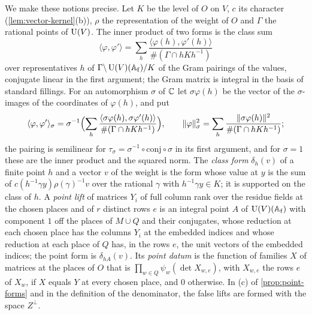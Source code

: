 We make these notions precise. Let $K$ be the level of $O$ on $V$, $c$ its character (\cref{lem:vector-kernel}(b)), $\rho$ the representation of the weight of $O$ and $\Gamma$ the rational points of $\operatorname{U}(V)$.
The inner product of two forms is the class sum
\[
  \langle\varphi,\varphi'\rangle=\sum_h\frac{\langle\varphi(h),\varphi'(h)\rangle}{\#(\Gamma\cap hKh^{-1})}
\]
over representatives $h$ of $\Gamma\backslash\operatorname{U}(V)(\mathbb{A}_{\rm f})/K$ of the Gram pairings of the values, conjugate linear in the first argument; the Gram matrix is integral in the basis of standard fillings. For an
automorphism $\sigma$ of $\mathbb{C}$ let $\sigma\varphi(h)$ be the vector of the $\sigma$-images of the coordinates of $\varphi(h)$, and put
\[
  \langle\varphi,\varphi'\rangle_\sigma=\sigma^{-1}\Bigl(\sum_h\frac{\langle\sigma\varphi(h),\sigma\varphi'(h)\rangle}{\#(\Gamma\cap hKh^{-1})}\Bigr),\qquad
  \lVert \varphi\rVert_\sigma^2=\sum_h\frac{\lVert \sigma\varphi(h)\rVert^2}{\#(\Gamma\cap hKh^{-1})};
\]
the pairing is semilinear for $\tau_\sigma=\sigma^{-1}\circ\mathrm{conj}\circ\sigma$ in its first argument, and for $\sigma=1$ these are the inner product and the squared norm. The \emph{class form} $\delta_h(v)$ of a
finite point $h$ and a vector $v$ of the weight is the form whose value at $y$ is the sum of $c(h^{-1}\gamma y)\rho(\gamma)^{-1}v$ over the rational $\gamma$ with $h^{-1}\gamma y\in K$; it is supported on the
class of $h$. A \emph{point lift} of matrices $Y_i$ of full column rank over the residue fields at the chosen places and of $r$ distinct rows $e$ is an integral point $A$ of $\operatorname{U}(V)(\mathbb{A}_{\rm f})$ with
component $1$ off the places of $M\cup Q$ and their conjugates, whose reduction at each chosen place has the columns $Y_i$ at the embedded indices and whose reduction at each place of $Q$ has, in
the rows $e$, the unit vectors of the embedded indices; the point form is $\delta_{hA}(v)$. Its \emph{point datum} is the function of families $X$ of matrices at the places of $O$ that is
$\prod_{w\in Q}\psi_w(\det X_{w,e})$, with $X_{w,e}$ the rows $e$ of $X_w$, if $X$ equals $Y$ at every chosen place, and $0$ otherwise. In (c) of \cref{prop:point-forms} and in the definition of the
denominator, the false lifts are formed with the space $Z^\perp$.

